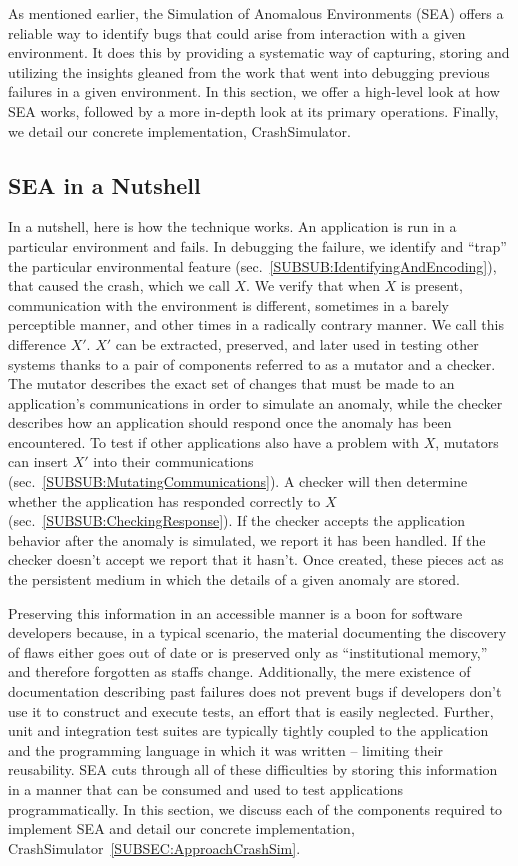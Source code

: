 As mentioned earlier,
the Simulation of Anomalous Environments (SEA)
offers a reliable way to identify bugs that could arise from interaction
with a given environment.
It does this by providing a systematic way of
capturing, storing and utilizing the insights gleaned from the work that
went into debugging previous failures in a given environment.
In this section, we offer a high-level look at how SEA works, followed by
a more in-depth look at its primary operations.
Finally, we detail our concrete implementation, CrashSimulator.

\subsection{SEA in a Nutshell}
\label{SEC:SEANutshell}
In a nutshell,
here is how the technique works.
An application is run
in a particular environment and fails.
In debugging the failure,
we identify and ``trap'' the particular environmental feature
(sec.~\ref{SUBSUB:IdentifyingAndEncoding}),
that caused the crash,  which we call $X$.
We verify that when $X$ is present,
communication with the
environment is different,
sometimes in a barely perceptible manner,
and other times in a radically contrary manner.
We call this difference $X'$.
$X'$ can be extracted, preserved,
and later used in testing other systems
thanks to a pair of components referred to as a mutator and a checker.
The mutator describes the exact set of changes
that must be made to an application's communications
in order to simulate an anomaly,
while the checker describes how an
application should respond once the anomaly has been encountered.
To test if other applications also have a problem with $X$,
mutators can insert $X'$ into their
communications (sec.~\ref{SUBSUB:MutatingCommunications}).
A checker will then determine whether the
application has responded correctly to
$X$(sec.~\ref{SUBSUB:CheckingResponse}).
If the checker accepts the application behavior
after the anomaly is simulated,
we report it has been handled.
If the checker doesn't accept we report that it hasn't.
Once created,
these pieces act as the persistent medium in which the details of
a given anomaly are stored.

Preserving this information in an accessible manner
is a boon for software developers because,
in a typical scenario, the material documenting
the discovery of flaws
either goes out of date or
is preserved only as ``institutional memory,''
and therefore forgotten as staffs change.
Additionally,
the mere existence of documentation
describing past failures
does not prevent bugs
if developers don't use it
to construct and execute tests,
an effort that is easily neglected.
Further, unit and integration test suites
are typically tightly coupled
to the application and the programming language in which it was written --
limiting their reusability.
SEA cuts through all of these difficulties by
storing this information in a manner that can be consumed
and used to test applications programmatically.
In this section, we discuss each of the components
required to implement SEA
and detail our concrete implementation,
CrashSimulator~\ref{SUBSEC:ApproachCrashSim}.

